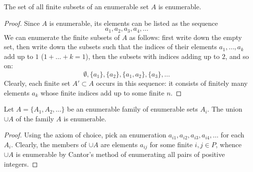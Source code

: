 \begin{exercise}[1.6]
  The set of all finite subsets of an enumerable set $A$ is enumerable.
\end{exercise}
\begin{proof}
  Since $A$ is enumerable, its elements can be listed as the sequence
  \begin{equation*}
    a_1, a_2, a_3, a_4, \ldots
  \end{equation*}
  We can enumerate the finite subsets of $A$ as follows: first write down the empty set, then write down the subsets such that the indices of their elements $a_1, \ldots, a_k$ add up to $1$ ($1 + \ldots + k = 1$), then the subsets with indices adding up to $2$, and so on:
  \begin{equation}
    \emptyset, \{a_1\}, \{a_2\}, \{a_1, a_2\}, \{a_3\}, \ldots
  \end{equation}
  Clearly, each finite set $A' \subset A$ occurs in this sequence: it consists of finitely many elements $a_k$ whose finite indices add up to some finite $n$.
\end{proof}

\begin{exercise}[1.7]
  Let $A = \{A_1, A_2, \ldots\}$ be an enumerable family of enumerable sets $A_i$.
  The union $\cup A$ of the family $A$ is enumerable.
\end{exercise}
\begin{proof}
  Using the axiom of choice, pick an enumeration $a_{i1}, a_{i2}, a_{i3}, a_{i4}, \ldots$ for each $A_i$.
  Clearly, the members of $\cup A$ are elements $a_{ij}$ for some finite $i,j \in P$, whence $\cup A$ is enumerable by Cantor's method of enumerating all pairs of positive integers.
\end{proof}

